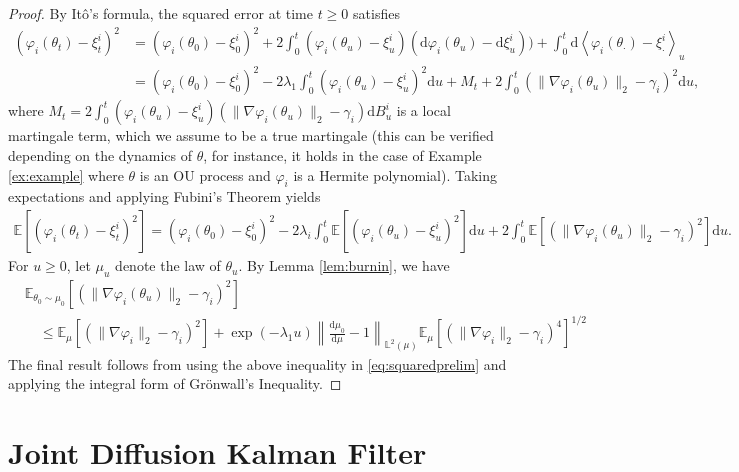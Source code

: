 \documentclass[11pt]{article}
\theoremstyle{plain}
\theoremstyle{definition}
\theoremstyle{remark}
\numberwithin{equation}{section}
\renewcommand{\d}{\mathrm{d}}
\newcommand{\lb}{\left}
\newcommand{\rb}{\right}
\newcommand{\bL}{\mathbb{L}}
\newcommand{\E}{\mathbb{E}}
\begin{document}
\begin{proof}
By It\^{o}'s formula, the squared error at time $t\ge 0$ satisfies
\begin{align*}
(\varphi_i(\theta_t)-\xi^i_{t})^2&=(\varphi_i(\theta_0)-\xi^i_{0})^2+2\int_0^{t} (\varphi_i(\theta_{u})-\xi^i_{u})(\d \varphi_i(\theta_{u})-\d\xi^i_{u}))+\int_0^t\d\lb\langle \varphi_i(\theta_{\cdot})-\xi^i_\cdot\rb\rangle_u\\
&= (\varphi_i(\theta_0)-\xi^i_{0})^2 -2\lambda_1 \int_0^t (\varphi_i(\theta_u)-\xi^i_{u})^2\d u+M_t+2\int_0^t\lb( \|\nabla \varphi_i(\theta_{u})\|_2-\gamma_i\rb)^2\d u,
\end{align*}
where $M_t=2\int_0^{t} (\varphi_i(\theta_{u})-\xi^i_{u})(\|\nabla\varphi_i(\theta_{u})\|_2-\gamma_i)\d B_u^i$ is a local martingale term, which we assume to be a true martingale (this can be verified depending on the dynamics of $\theta$, for instance, it holds in the case of Example \ref{ex:example} where $\theta$ is an OU process and $\varphi_i$ is a Hermite polynomial). Taking expectations and applying Fubini's Theorem yields
\begin{align}\label{eq:squaredprelim}
\E\lb[(\varphi_i(\theta_t)-\xi^i_{t})^2\rb]
= (\varphi_i(\theta_0)-\xi^i_{0})^2 -2\lambda_i \int_0^t \E\lb[(\varphi_i(\theta_u)-\xi^i_{u})^2\rb]\d u+2\int_0^t\E\lb[\lb( \|\nabla \varphi_i(\theta_{u})\|_2-\gamma_i\rb)^2\rb]\d u.
\end{align}
For $u\ge0$, let $\mu_u$ denote the law of $\theta_u$. By Lemma \ref{lem:burnin}, we have
\begin{align*}
&\E_{\theta_0\sim\mu_0}\lb[\lb( \|\nabla \varphi_i(\theta_{u})\|_2-\gamma_i\rb)^2\rb]\\
&\quad\le \E_{\mu}\lb[\lb( \|\nabla \varphi_i\|_2-\gamma_i\rb)^2\rb] +\exp(-\lambda_1 u)\lb\|\frac{\d\mu_0}{\d\mu}-1\rb\|_{\bL^2(\mu)}\E_{\mu}\lb[\lb( \|\nabla \varphi_i\|_2-\gamma_i\rb)^{4}\rb]^{1/2}
\end{align*}
The final result follows from using the above inequality in \eqref{eq:squaredprelim} and applying the integral form of Gr\"{o}nwall's Inequality. \qedhere
\end{proof}



\section{Joint Diffusion Kalman Filter}
\label{sec:jdkf_model}
\end{document}
